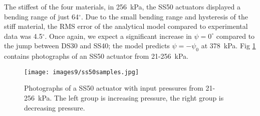 The stiffest of the four materials, in 256~kPa, the SS50 actuators displayed a bending range of just 64$^\circ$. Due to the small bending range and hysteresis of the stiff material, the RMS error of the analytical model compared to experimental data was 4.5$^\circ$. Once again, we expect a significant increase in $\psi=0^\circ$ compared to the jump between DS30 and SS40; the model predicts $\psi=-\psi_0$ at 378~kPa. Fig \ref{fig:ss50samples} contains photographs of an SS50 actuator from 21-256~kPa. 

\begin{figure}[ht]
    \centering
     \texttt{[image: images9/ss50samples.jpg]}
    \caption{Photographs of a SS50 actuator with input pressures from 21-256~kPa. The left group is increasing pressure, the right group is decreasing pressure.}
    \label{fig:ss50samples}
\end{figure}

